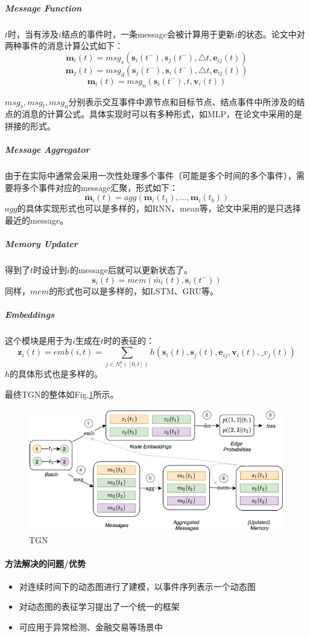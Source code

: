 \subparagraph{Message Function}
$t$时，当有涉及$i$结点的事件时，一条message会被计算用于更新$i$的状态。论文中对两种事件的消息计算公式如下：
$$
\mathbf{m}_i(t) = msg_s(\mathbf{s}_i(t^{-}), \mathbf{s}_j(t^{-}), \triangle t, \mathbf{e}_{ij}(t))
$$
$$
\mathbf{m}_j(t) = msg_d(\mathbf{s}_j(t^{-}), \mathbf{s}_i(t^{-}), \triangle t, \mathbf{e}_{ij}(t))
$$
$$
\mathbf{m}_i(t) = msg_n(\mathbf{s}_i(t^{-}), t, \mathbf{v}_{i}(t))
$$

$msg_s, msg_t, msg_n$分别表示交互事件中源节点和目标节点、结点事件中所涉及的结点的消息的计算公式。具体实现时可以有多种形式，如MLP，在论文中采用的是拼接的形式。

\subparagraph{Message Aggregator}
由于在实际中通常会采用一次性处理多个事件（可能是多个时间的多个事件），需要将多个事件对应的message汇聚，形式如下：
$$
\bar{\mathbf{m}}_i(t) = agg(\mathbf{m}_i(t_1), ..., \mathbf{m}_i(t_b))
$$
$agg$的具体实现形式也可以是多样的，如RNN、mean等，论文中采用的是只选择最近的message。

\subparagraph{Memory Updater}
得到了$t$时设计到$i$的message后就可以更新状态了。
$$
\mathbf{s}_i(t) = mem(\bar{m}_i(t), \mathbf{s}_i(t^-))
$$
同样，$mem$的形式也可以是多样的，如LSTM、GRU等。

\subparagraph{Embeddings}
这个模块是用于为$i$生成在$t$时的表征的：
$$
\mathbf{z}_i(t) = emb(i, t) = \sum_{j \in N_i^k([0, t])} h(\mathbf{s}_i(t), \mathbf{s}_j(t), \mathbf{e}_{ij}, \mathbf{v}_i(t), \mathbf_{v}_j(t))
$$
$h$的具体形式也是多样的。

最终TGN的整体如Fig.\ref{fig:tgn}所示。
\begin{figure}[h]
	\centering
	\includegraphics[width=.8\textwidth]{pics/TGN.png}
	\caption{TGN}
	\label{fig:tgn}
\end{figure}



\paragraph{方法解决的问题/优势}

\begin{itemize}

	\item 对连续时间下的动态图进行了建模，以事件序列表示一个动态图
	\item 对动态图的表征学习提出了一个统一的框架
	\item 可应用于异常检测、金融交易等场景中
	
\end{itemize}

